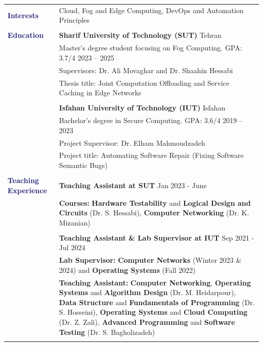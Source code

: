 \documentclass[letterpaper, 11pt]{article}
\begin{document}
\begin{longtable}{p{1.7in}p{5.1in}}


\nohyphens{\textcolor{MidnightBlue}{\textbf{\fontsize{12.6pt}{15pt}\selectfont Interests}}}
& Cloud, Fog and Edge Computing, DevOps and Automation Principles \\
& \\


\textcolor{MidnightBlue}{\textbf{\fontsize{12.6pt}{15pt}\selectfont Education}} 
& \textbf{Sharif University of Technology (SUT)} \hfill Tehran \\ 
& Master's degree student focusing on Fog Computing. GPA: 3.7/4 \hfill 2023 -- 2025 \\
& Supervisors: Dr. Ali Movaghar and Dr. Shaahin Hessabi  \\
& Thesis title: Joint Computation Offloading and Service Caching in Edge Networks \\
& \\

& \textbf{Isfahan University of Technology (IUT)} \hfill Isfahan \\ 
& Bachelor's degree in Secure Computing. GPA: 3.6/4 \hfill 2019 -- 2023 \\
& Project Supervisor: Dr. Elham Mahmoudzadeh \\
& Project title: Automating Software Repair (Fixing Software Semantic Bugs) \\
& \\


{\textcolor{MidnightBlue}{\textbf{\fontsize{12.6pt}{15pt}\selectfont Teaching Experience}}} 
& \textbf{Teaching Assistant at SUT} \hfill Jan 2023 - June \\
& \textbf{Courses:} \textbf{Hardware Testability} and \textbf{Logical Design and Circuits} (Dr. S. Hessabi), \textbf{Computer Networking} (Dr. K. Mizanian) \\
& \\

& \textbf{Teaching Assistant \& Lab Supervisor at IUT} \hfill Sep 2021 - Jul 2024 \\
& \textbf{Lab Supervisor:} \textbf{Computer Networks} (Winter 2023 \& 2024) and \textbf{Operating Systems} (Fall 2022) \\
& \textbf{Teaching Assistant:} \textbf{Computer Networking}, \textbf{Operating Systems} and \textbf{Algorithm Design} (Dr. M. Heidarpour), \textbf{Data Structure} and \textbf{Fundamentals of Programming} (Dr. S. Hosseini), \textbf{Operating Systems} and \textbf{Cloud Computing} (Dr. Z. Zali), \textbf{Advanced Programming} and \textbf{Software Testing} (Dr. S. Bagholizadeh) \\
& \\


\end{longtable}
\end{document}
